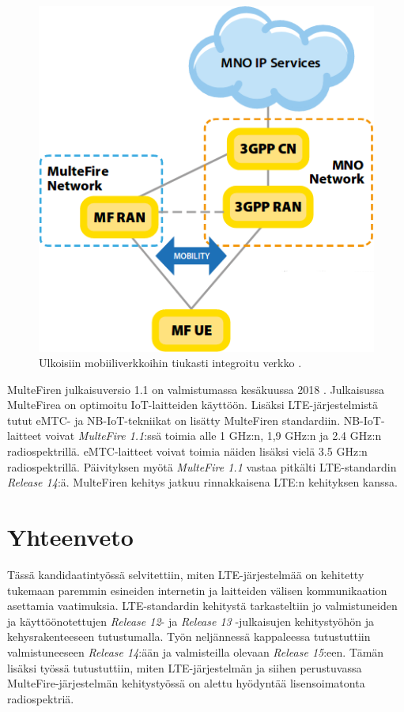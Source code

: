 \documentclass[finnish, 12pt, a4paper, elec, latin1, utf8, online]{aaltothesis}
\begin{document}
\begin{figure}[h!]
    \centering
    \includegraphics[scale=0.25]{Images/MF3.png}
    \caption{Ulkoisiin mobiiliverkkoihin tiukasti integroitu verkko \cite{chambers2016multefire}.}
    \label{fig:MF3}
\end{figure}

MulteFiren julkaisuversio 1.1 on valmistumassa kesäkuussa 2018 \cite{multefire11}. Julkaisussa MulteFirea on optimoitu IoT-laitteiden käyttöön. Lisäksi LTE-järjestelmistä tutut eMTC- ja NB-IoT-tekniikat on lisätty MulteFiren standardiin. NB-IoT-laitteet voivat \textit{MulteFire 1.1}:ssä toimia alle 1 GHz:n, 1,9 GHz:n ja 2.4 GHz:n radiospektrillä. eMTC-laitteet voivat toimia näiden lisäksi vielä 3.5 GHz:n radiospektrillä. Päivityksen myötä \textit{MulteFire 1.1} vastaa pitkälti LTE-standardin \textit{Release 14}:ä. MulteFiren kehitys jatkuu rinnakkaisena LTE:n kehityksen kanssa.

\clearpage
\section{Yhteenveto}

Tässä kandidaatintyössä selvitettiin, miten LTE-järjestelmää on kehitetty tukemaan paremmin esineiden internetin ja laitteiden välisen kommunikaation asettamia vaatimuksia. LTE-standardin kehitystä tarkasteltiin jo valmistuneiden ja käyttöönotettujen \textit{Release 12}- ja \textit{Release 13} -julkaisujen kehitystyöhön ja kehysrakenteeseen tutustumalla. Työn neljännessä kappaleessa tutustuttiin valmistuneeseen \textit{Release 14}:ään ja valmisteilla olevaan \textit{Release 15}:een. Tämän lisäksi työssä tutustuttiin, miten LTE-järjestelmän ja siihen perustuvassa MulteFire-järjestelmän kehitystyössä on alettu hyödyntää lisensoimatonta radiospektriä.
\end{document}
